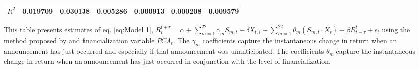 \begin{sidewaystable}
{\begin{tabular}{@{}lllllllllllll@{}}
                                           \\ \textbf{$R^2$}             &\multicolumn{2}{c}{ 0.019709 }                                                 & \multicolumn{2}{c}{ 0.030138 }                                                 & \multicolumn{2}{c}{ 0.005286 }                                                 & \multicolumn{2}{c}{ 0.000913 }                                                 & \multicolumn{2}{c}{ 0.000208 }                                                   & \multicolumn{2}{c}{ 0.009579 }                                                 \\ \bottomrule 
\end{tabular}
}
\begin{tablenotes}\item 
    \singlespacing
    \footnotesize
    This table presents estimates of eq. \ref{eq:Model 1}, $R_{t}^{t+\tau}=\alpha+\sum_{m=1}^{22} \gamma_m S_{m,t}+ \delta X_{t,i} + \sum_{m=1}^{22} \theta_m (S_{m,t} \cdot X_t)+\beta R_{t-\tau}^{t}+\epsilon_{t}$ using the method proposed by \citet{kurov2019price} and financialization variable $PCA_t$. The $\gamma_m$ coefficients capture the instantaneous change in return when an announcement has just occurred and especially if that announcement was unanticipated. The coefficients $\theta_m$ capture the instantaneous change in return when an announcement has just occurred in conjunction with the level of financialization.
\end{tablenotes}
\end{sidewaystable}


